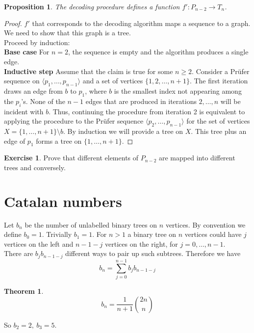 \documentclass{article}
\newtheorem*{thm}{Theorem}
\newtheorem*{prop}{Proposition}
\theoremstyle{definition}
\newtheorem*{exer}{Exercise}
\begin{document}
\begin{prop}
The decoding procedure defines a function $f'\colon P_{n-2} \to T_n$.
\end{prop}

\begin{proof}
$f'$ that corresponds to the decoding algorithm maps a sequence to a graph.
We need to show that this graph is a tree. \\
Proceed by induction: \\
\textbf{Base case} For $n=2$, the sequence is empty and the algorithm produces a single edge. \\
\textbf{Inductive step} Assume that the claim is true for some $n\ge 2$.
Consider a Pr\"ufer sequence on $\langle p_1,\ldots,p_{n-1}\rangle$ and a set of vertices $\{1,2,\ldots,n+1\}$.
The first iteration draws an edge from $b$ to $p_1$, where $b$ is the smallest index not appearing among the $p_i$'s.
None of the $n-1$ edges that are produced in iterations $2,\ldots,n$ will be incident with $b$.
Thus, continuing the procedure from iteration 2 is equivalent to applying the procedure to the Pr\"ufer sequence $\langle p_2,\ldots,p_{n-1}\rangle$ for the set of vertices $X = \{1,\ldots,n+1\}\setminus b$.
By induction we will provide a tree on $X$.
This tree plus an edge of $p_1$ forms a tree on $\{1,\ldots,n+1\}$.
\end{proof}

\begin{exer}
Prove that different elements of $P_{n-2}$ are mapped into different trees and conversely.
\end{exer}

\section{Catalan numbers}

Let $b_n$ be the number of unlabelled binary trees on $n$ vertices.
By convention we define $b_0 = 1$.
Trivially $b_1 = 1$.
For $n>1$ a binary tree on $n$ vertices could have $j$ vertices on the left and $n-1-j$ vertices on the right, for $j=0,\ldots,n-1$. \\
There are $b_jb_{n-1-j}$ different ways to pair up such subtrees.
Therefore we have
$$b_n =\sum_{j=0}^{n-1} b_jb_{n-1-j}$$

\begin{thm}
$$b_n = \frac{1}{n+1}\binom{2n}{n}$$
\end{thm}

So $b_2=2,\ b_3=5$.
\end{document}
